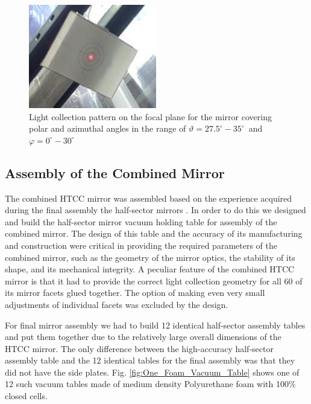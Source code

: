 \begin{figure}[ht]
    \centering
    \includegraphics[width=0.95\linewidth]{images/Focal_Plane_1R.jpg}
    \caption{Light collection pattern on the focal plane for the mirror covering polar and azimuthal angles in the range of $\vartheta = 27.5^\circ - 35^\circ$\, and\, $\varphi = 0^\circ - 30^\circ$}
    \label{fig:Focal_Plane_1R}
\end{figure}


\subsection{Assembly of the Combined Mirror}

The combined HTCC mirror was assembled based on the experience acquired during the final assembly the half-sector mirrors . In order to do this we designed and build the half-sector mirror vacuum holding table for assembly of the combined mirror. The design of this table and the accuracy of its manufacturing and construction were critical in providing the required parameters of the combined mirror, such as the geometry of the mirror optics, the stability of its shape, and its mechanical integrity. A peculiar feature of the combined HTCC mirror is that it had to provide the correct light collection geometry for all 60 of its mirror facets glued together. The option of making even very small adjustments of individual facets was excluded by the design.
 
For final mirror assembly we had to build 12 identical half-sector assembly tables and put them together due to the relatively large overall dimensions of the HTCC mirror. The only difference between the high-accuracy half-sector assembly table and the 12 identical tables for the final assembly was that they did not have the side plates. Fig. \ref{fig:One_Foam_Vacuum_Table} shows one of 12 such vacuum tables made of medium density Polyurethane foam with 100\% closed cells.
 
